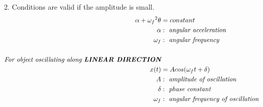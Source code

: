 \documentclass{article}
\begin{document}
\begin{enumerate}
    2. Conditions are valid if the amplitude is small. \\ 
    \begin{align*}
        \alpha+{\omega_f}^2\theta&=constant \\
        \alpha&:\textit{ angular acceleration} \\
        \omega_f&:\textit{ angular frequency} \\
        \\
        \textit{For object oscillating along \textbf{LINEAR DIRECTION}} \\
        x(t)&=Acos(\omega_ft+\delta) \\
        A&:\textit{ amplitude of oscillation} \\
        \delta&:\textit{ phase constant} \\
        \omega_f&:\textit{ angular frequency of oscillation} \\
        \\
    \end{align*}
\end{enumerate}
\end{document}
